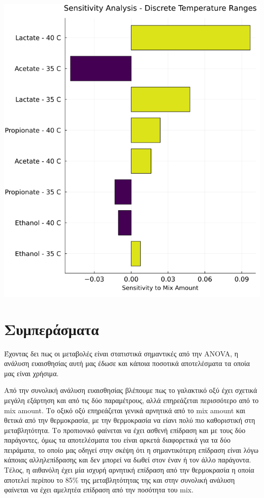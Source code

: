 \documentclass[11pt]{article}
\begin{document}
\begin{center}
\includegraphics[width=.9\linewidth]{../plots/sensitivity/temperature_tornado.png}
\end{center}

\section{Συμπεράσματα}
\label{sec:org979780e}
Έχοντας δει πως οι μεταβολές είναι στατιστικά σημαντικές από την ANOVA, η ανάλυση ευαισθησίας αυτή μας έδωσε και κάποια ποσοτικά αποτελέσματα τα οποία μας είναι χρήσιμα.

Από την συνολική ανάλυση ευαισθησίας βλέπουμε πως το γαλακτικό οξύ έχει σχετικά μεγάλη εξάρτηση και από τις δύο παραμέτρους, αλλά επηρεάζεται περισσότερο από το mix amount. Το οξικό οξύ επηρεάζεται γενικά αρνητικά από το mix amount και θετικά από την θερμοκρασία, με την θερμοκρασία να είανι πολύ πιο καθοριστική στη μεταβλητότητα. Το προπιονικό φαίνεται να έχει ασθενή επίδραση και με τους δύο παράγοντες, όμως τα αποτελέσματα του είναι αρκετά διαφορετικά για τα δύο πειράματα, το οποίο μας οδηγεί στην σκέψη ότι η σημαντικότερη επίδραση είναι λόγω κάποιας αλληλεπίδρασης και δεν μπορεί να δωθεί στον έναν ή τον άλλο παράγοντα. Τέλος, η αιθανόλη έχει μία ισχυρή αρνητική επίδραση από την θερμοκρασία η οποία αποτελεί περίπου το 85\% της μεταβλητότητας της και στην συνολική ανάλυση φαίνεται να έχει αμελητέα επίδραση από την ποσότητα του mix.
\end{document}
